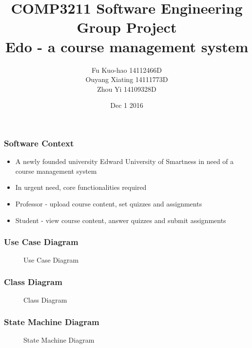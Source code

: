 \documentclass{beamer}
\title[SE Project]{COMP3211 Software Engineering \\
                        Group Project \\
                        Edo - a course management system} %
\author{Fu Kuo-hao 14112466D \\
        Ouyang Xiating 14111773D \\
        Zhou Yi 14109328D} %
\institute %
{
Department of Computing
}
\date{Dec 1 2016} %
\begin{document}
\begin{frame}
\titlepage %
\end{frame}

\begin{frame}
\frametitle{Software Context} %
\begin{itemize}
	\item A newly founded university Edward University of Smartness in need of a course management system
	\item In urgent need, core functionalities required
	\item Professor - upload course content, set quizzes and assignments
	\item Student - view course content, answer quizzes and submit assignments
\end{itemize}
\end{frame}


\begin{frame}
\frametitle{Use Case Diagram}
\begin{figure}[!ht]
	\begin{center}
	\end{center}
	\caption{Use Case Diagram}
\end{figure}
\end{frame}

\begin{frame}
	\frametitle{Class Diagram}
	\begin{figure}[!ht]
		\begin{center}
		\end{center}
		\caption{Class Diagram}
	\end{figure}
	
\end{frame}

\begin{frame}
	\frametitle{State Machine Diagram}
	\begin{figure}[!ht]
		\begin{center}
		\end{center}
		\caption{State Machine Diagram}
	\end{figure}
\end{frame}
\end{document}
